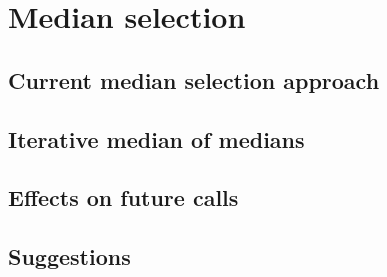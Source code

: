 \section{Median selection}
\subsection{Current median selection approach}
\subsection{Iterative median of medians}
\subsection{Effects on future calls}
\subsection{Suggestions}

